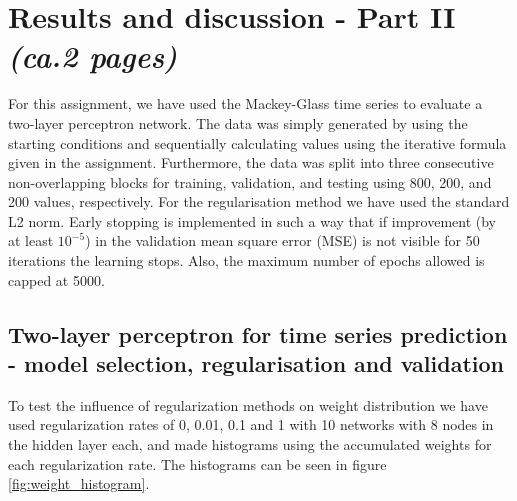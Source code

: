\documentclass[a4paper]{article}
\begin{document}
\section{Results and discussion - Part II \textit{(ca.2 pages)}}


For this assignment, we have used the Mackey-Glass time series to evaluate a two-layer perceptron network. The data was simply generated by using the starting conditions and sequentially calculating values using the iterative formula given in the assignment. Furthermore, the data was split into three consecutive non-overlapping blocks for training, validation, and testing using 800, 200, and 200 values, respectively. For the regularisation method we have used the standard L2 norm. Early stopping is implemented in such a way that if improvement (by at least $10^{-5}$) in the validation mean square error (MSE) is not visible for 50 iterations the learning stops. Also, the maximum number of epochs allowed is capped at 5000.

\subsection{Two-layer perceptron for time series prediction - model selection, regularisation and validation}
To test the influence of regularization methods on weight distribution we have used regularization rates of 0, 0.01, 0.1 and 1 with 10 networks with 8 nodes in the hidden layer each, and made histograms using the accumulated weights for each regularization rate. The histograms can be seen in figure \ref{fig:weight_histogram}.
\end{document}
